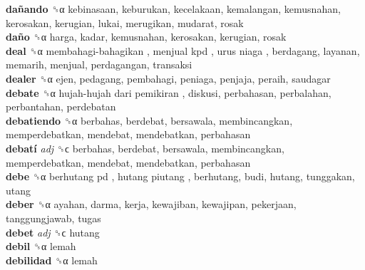 \textbf{dañando} ␝α  kebinasaan, keburukan, kecelakaan, kemalangan, kemusnahan, kerosakan, kerugian, lukai, merugikan, mudarat, rosak  \\
\textbf{daño} ␝α  harga, kadar, kemusnahan, kerosakan, kerugian, rosak  \\
\textbf{deal} ␝α   membahagi-bahagikan ,  menjual kpd ,  urus niaga , berdagang, layanan, memarih, menjual, perdagangan, transaksi  \\
\textbf{dealer} ␝α  ejen, pedagang, pembahagi, peniaga, penjaja, peraih, saudagar  \\
\textbf{debate} ␝α   hujah-hujah dari pemikiran , diskusi, perbahasan, perbalahan, perbantahan, perdebatan  \\
\textbf{debatiendo} ␝α  berbahas, berdebat, bersawala, membincangkan, memperdebatkan, mendebat, mendebatkan, perbahasan  \\
\textbf{debatí} \emph{adj}  ␝ϲ  berbahas, berdebat, bersawala, membincangkan, memperdebatkan, mendebat, mendebatkan, perbahasan  \\
\textbf{debe} ␝α   berhutang pd ,  hutang piutang , berhutang, budi, hutang, tunggakan, utang  \\
\textbf{deber} ␝α  ayahan, darma, kerja, kewajiban, kewajipan, pekerjaan, tanggungjawab, tugas  \\
\textbf{debet} \emph{adj}  ␝ϲ  hutang  \\
\textbf{debil} ␝α  lemah  \\
\textbf{debilidad} ␝α  lemah  \\
